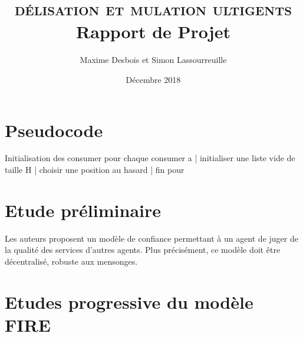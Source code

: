 \documentclass{article}
\title{%
    \vspace*{\fill}
    \textbf{\scshape \tcol{Mo}délisation et \tcol{Si}mulation \tcol{M}ulti\tcol{A}gents}\\
    Rapport de Projet
}
\author{
    Maxime Desbois et Simon Lassourreuille
}
\date{
    Décembre 2018
    \vspace*{\fill}
}
\begin{document}
\maketitle

\clearpage

\section{Pseudocode}

\begin{pseudocode}{Initialisation des consumer}
pour chaque consumer a
|   initialiser une liste vide de taille H
|   choisir une position au hasard
|   
fin pour
\end{pseudocode}

\section{Etude préliminaire}


Les auteurs proposent un modèle de confiance permettant à un agent de juger de la qualité des services d'autres agents. Plus précisément, ce modèle doit être décentralisé, robuste aux mensonges.



\section{Etudes progressive du modèle FIRE}
\label{sec:etude-preliminaire}

\end{document}
